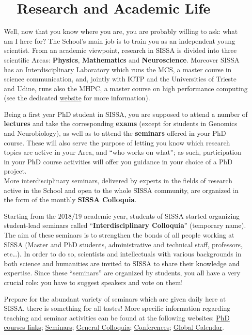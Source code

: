 \documentclass{sissavademecum}
\begin{document}
\chapter{\texorpdfstring{\faGraduationCap\ }{} Research and Academic Life}

Well, now that you know where you are, you are probably willing to ask: what am I here for? The School's main job is to train you as an independent young scientist. From an academic viewpoint, research in SISSA is divided into three scientific Areas: \textbf{Physics}, \textbf{Mathematics} and \textbf{Neuroscience}. Moreover SISSA has an Interdisciplinary Laboratory which runs the MCS, a master course in science communication, and, jointly with ICTP and the Universities of Trieste and Udine, runs also the MHPC, a master course on high performance computing (see the dedicated \href{https://www.sissa.it/ilas/}{website} for more information).

Being a first year PhD student in SISSA, you are supposed to attend a number of\textbf{ lectures }and take the corresponding \textbf{exams} (except for students in Genomics and Neurobiology), as well as to attend the \textbf{seminars} offered in your PhD course. These will also serve the purpose of letting you know which research topics are active in your Area, and ``who works on what''; as such, participation in your PhD course activities will offer you guidance in your choice of a PhD project.\\
More interdisciplinary seminars, delivered by experts in the fields of research active in the School and open to the whole SISSA community, are organized in the form of the monthly \textbf{SISSA Colloquia}.

Starting from the $2018/19$ academic year, students of SISSA started organizing student-lead seminars called ``\textbf{Interdisciplinary Colloquia}'' (temporary name). The aim of these seminars is to strengthen the bonds of all people working at SISSA (Master and PhD students, administrative and technical staff, professors, etc\dots). In order to do so, scientists and intellectuals with various backgrounds in both science and humanities are invited to SISSA to share their knowledge and expertise. Since these ``seminars'' are organized by students, you all have a very crucial role: you have to suggest speakers and vote on them!

Prepare for the abundant variety of seminars which are given daily here at SISSA, there is something for all tastes! More specific information regarding teaching and seminar activities can be found at the following websites:  \href{https://www.sissa.it/phd-courses}{PhD courses links};   \href{https://www.sissa.it/calendar/event-type/seminar}{Seminars};  \href{https://www.sissa.it/news/colloquia}{General Colloquia};  \href{https://www.sissa.it/news/conferences}{Conferences}; \href{https://www.sissa.it/calendar}{Global Calendar}.
\end{document}
